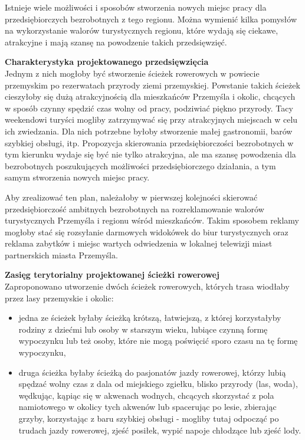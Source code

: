 \documentclass{sprawozdanie-agh}
\begin{document}
		Istnieje wiele możliwości i sposobów stworzenia nowych miejsc pracy dla przedsiębiorczych bezrobotnych z tego regionu. Można wymienić kilka pomysłów na wykorzystanie walorów turystycznych regionu, które wydają się ciekawe, atrakcyjne i mają szansę na powodzenie takich przedsięwzięć.
		
		\textbf{Charakterystyka projektowanego przedsięwzięcia}\\
		Jednym z nich mogłoby być stworzenie ścieżek rowerowych w powiecie przemyskim po rezerwatach przyrody ziemi przemyskiej. Powstanie takich ścieżek cieszyłoby się dużą atrakcyjnością dla mieszkańców Przemyśla i okolic, chcących w sposób czynny spędzić czas wolny od pracy, podziwiać piękno przyrody. Tacy weekendowi turyści mogliby zatrzymywać się przy atrakcyjnych miejscach w celu ich zwiedzania. Dla nich potrzebne byłoby stworzenie małej gastronomii, barów szybkiej obsługi, itp. Propozycja skierowania przedsiębiorczości bezrobotnych w tym kierunku wydaje się być nie tylko atrakcyjna, ale ma szansę powodzenia dla bezrobotnych poszukujących możliwości przedsiębiorczego działania, a tym samym stworzenia nowych miejsc pracy.
		
		Aby zrealizować ten plan, należałoby w pierwszej kolejności skierować przedsiębiorczość ambitnych bezrobotnych na rozreklamowanie walorów turystycznych Przemyśla i regionu wśród mieszkańców. Takim sposobem reklamy mogłoby stać się rozsyłanie darmowych widokówek do biur turystycznych oraz reklama zabytków i miejsc wartych odwiedzenia w lokalnej telewizji miast partnerskich miasta Przemyśla.
		
		\textbf{Zasięg terytorialny projektowanej ścieżki rowerowej}\\
		Zaproponowano utworzenie dwóch ścieżek rowerowych, których trasa wiodłaby przez lasy przemyskie i okolic:
		\begin{itemize}
			\item jedna ze ścieżek byłaby ścieżką krótszą, łatwiejszą, z której korzystałyby rodziny z dziećmi lub osoby w starszym wieku, lubiące czynną formę wypoczynku lub też osoby, które nie mogą poświęcić sporo czasu na tę formę wypoczynku,
			\item druga ścieżka byłaby ścieżką do pasjonatów jazdy rowerowej, którzy lubią spędzać wolny czas z dala od miejskiego zgiełku, blisko przyrody (las, woda), wędkując, kąpiąc się w akwenach wodnych, chcących skorzystać z pola namiotowego w okolicy tych akwenów lub spacerując po lesie, zbierając grzyby, korzystając z baru szybkiej obsługi - mogliby tutaj odpocząć po trudach jazdy rowerowej, zjeść posiłek, wypić napoje chłodzące lub zjeść lody.
		\end{itemize}
	
\end{document}
